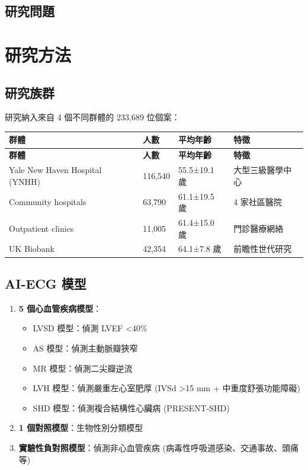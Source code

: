 \documentclass[12pt,a4paper]{article}
\begin{document}
\subsection{研究問題}


\section{研究方法}

\subsection{研究族群}

研究納入來自 4 個不同群體的 233,689 位個案：

\begin{longtable}{p{4cm}p{3cm}p{3cm}p{4cm}}
\toprule
\textbf{群體} & \textbf{人數} & \textbf{平均年齡} & \textbf{特徵} \\
\midrule
\endfirsthead
\toprule
\textbf{群體} & \textbf{人數} & \textbf{平均年齡} & \textbf{特徵} \\
\midrule
\endhead
Yale New Haven Hospital (YNHH) & 116,540 & 55.5±19.1 歲 & 大型三級醫學中心 \\
\midrule
Community hospitals & 63,790 & 61.1±19.5 歲 & 4 家社區醫院 \\
\midrule
Outpatient clinics & 11,005 & 61.4±15.0 歲 & 門診醫療網絡 \\
\midrule
UK Biobank & 42,354 & 64.1±7.8 歲 & 前瞻性世代研究 \\
\bottomrule
\end{longtable}

\subsection{AI-ECG 模型}

\begin{enumerate}
    \item \textbf{5 個心血管疾病模型}：
    \begin{itemize}
        \item LVSD 模型：偵測 LVEF <40\%
        \item AS 模型：偵測主動脈瓣狹窄
        \item MR 模型：偵測二尖瓣逆流
        \item LVH 模型：偵測嚴重左心室肥厚 (IVSd >15 mm + 中重度舒張功能障礙)
        \item SHD 模型：偵測複合結構性心臟病 (PRESENT-SHD)
    \end{itemize}
    \item \textbf{1 個對照模型}：生物性別分類模型
    \item \textbf{實驗性負對照模型}：偵測非心血管疾病 (病毒性呼吸道感染、交通事故、頭痛等)
\end{enumerate}
\end{document}
